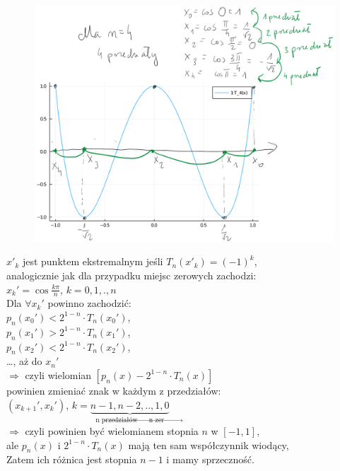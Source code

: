 \begin{frame}
	\begin{figure}
		\includegraphics[height=0.82\textheight]{img/5/czeb.png}
	\end{figure}
\end{frame}
\begin{frame}
		$x'_k$ jest punktem ekstremalnym jeśli $T_n(x'_k)=(-1)^k$,\\
		analogicznie jak dla przypadku miejsc zerowych zachodzi:\\ $x_k'=\cos\frac{k\pi}{n}$, $k=0,1,.,n$\\
        Dla $\forall x_k'$ powinno zachodzić: \\
        $p_n(x_0') < 2^{1-n} \cdot T_n(x_0')$, \\
        $p_n(x_1') > 2^{1-n} \cdot T_n(x_1')$, \\
        $p_n(x_2') < 2^{1-n} \cdot T_n(x_2')$, \\
        \ldots , aż do $x_n'$ \\
        $\Rightarrow$ czyli wielomian $[p_n(x) - 2^{1-n} \cdot T_n(x)]$ \\
        powinien zmieniać znak w każdym z przedziałów: \\
        $(x_{k+1}',x_k')$, $k = \underbrace{n-1, n-2,..,1,0}_{\text{n przedziałów $\rightarrow$ n zer}} $\\ 
         $\Rightarrow $ czyli powinien być wielomianem stopnia $n$ w $[-1,1]$, \\ 
         ale $p_n(x)$ i $2^{1-n} \cdot T_n(x)$ mają ten sam współczynnik wiodący, \\
         Zatem ich różnica jest stopnia $n-1$ i mamy sprzeczność.
	
\end{frame}
